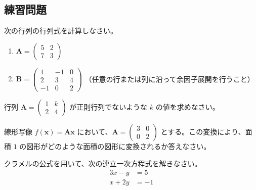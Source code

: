 \subsection{練習問題}

\begin{quiz}
次の行列の行列式を計算しなさい。
\begin{enumerate}
    \item $\bm{A} = \begin{pmatrix} 5 & 2 \\ 7 & 3 \end{pmatrix}$
    \item $\bm{B} = \begin{pmatrix} 1 & -1 & 0 \\ 2 & 3 & 4 \\ -1 & 0 & 2 \end{pmatrix}$ （任意の行または列に沿って余因子展開を行うこと）
\end{enumerate}
\end{quiz}

\begin{quiz}
行列 $\bm{A} = \begin{pmatrix} 1 & k \\ 2 & 4 \end{pmatrix}$ が正則行列でないような $k$ の値を求めなさい。
\end{quiz}

\begin{quiz}
線形写像 $f(\bm{x}) = \bm{A}\bm{x}$ において、$\bm{A} = \begin{pmatrix} 3 & 0 \\ 0 & 2 \end{pmatrix}$ とする。この変換により、面積 $1$ の図形がどのような面積の図形に変換されるか答えなさい。
\end{quiz}

\begin{quiz}
クラメルの公式を用いて、次の連立一次方程式を解きなさい。
\begin{align*} 3x - y &= 5 \\ x + 2y &= -1 \end{align*}
\end{quiz}